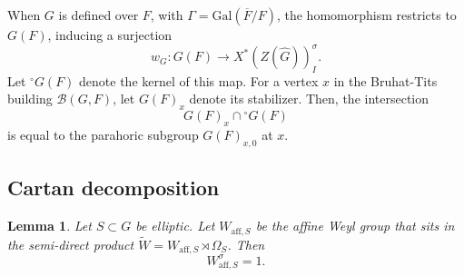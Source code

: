 \documentclass[american]{article}
\numberwithin{equation}{section}
\numberwithin{figure}{section}
\theoremstyle{plain}
\newtheorem{lemma}[theorem]{Lemma}
\theoremstyle{definition}
\theoremstyle{remark}
\begin{document}
When $G$ is defined over $F$, with $\Gamma = \mathrm{Gal}(\overline{F}/F)$, the homomorphism restricts to $G(F)$, inducing a surjection
\[
w_G: G(F) \to X^*(Z(\widehat{G}))_I^\sigma.
\]
Let ${}^{\circ}G(F)$ denote the kernel of this map. For a vertex $x$ in the Bruhat-Tits building $\mathscr{B}(G, F)$, let $G(F)_x$ denote its stabilizer. Then, the intersection
\[
G(F)_x \cap {}^{\circ}G(F)
\]
is equal to the parahoric subgroup $G(F)_{x,0}$ at $x$.

\subsection{Cartan decomposition}

\begin{lemma}\label{lem:no-sigma-in-wa}
Let $S\subset G$ be elliptic. Let $W_{\mathrm{aff},S}$ be the affine Weyl group that sits in the semi-direct product $\widetilde{W}=W_{\mathrm{aff},S}\rtimes \Omega_S$. Then
\[
   W_{\mathrm{aff},S}^{\sigma}=1.
\]
\end{lemma}
\end{document}
